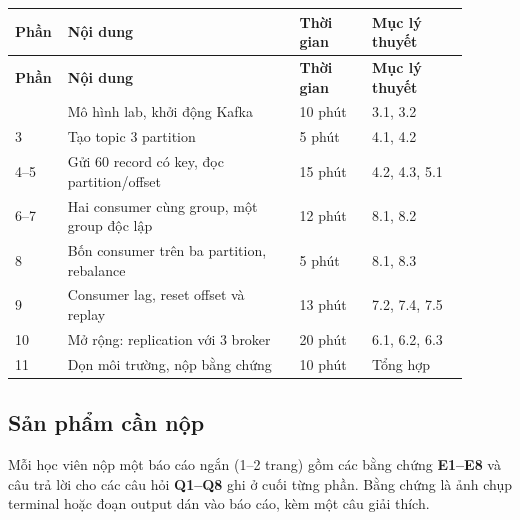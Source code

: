 \begingroup\small
\renewcommand{\arraystretch}{1.2}
\begin{longtable}{@{}p{0.07\linewidth}p{0.48\linewidth}p{0.15\linewidth}p{0.2\linewidth}@{}}
\toprule
\rowcolor{rowLavender}
\textbf{Phần} & \textbf{Nội dung} & \textbf{Thời gian} & \textbf{Mục lý thuyết} \\
\midrule
\endfirsthead
\toprule
\rowcolor{rowLavender}
\textbf{Phần} & \textbf{Nội dung} & \textbf{Thời gian} & \textbf{Mục lý thuyết} \\
\midrule
\endhead
\bottomrule
\endfoot
2 & Mô hình lab, khởi động Kafka & 10 phút & 3.1, 3.2 \\
3 & Tạo topic 3 partition & 5 phút & 4.1, 4.2 \\
4--5 & Gửi 60 record có key, đọc partition/offset & 15 phút & 4.2, 4.3, 5.1 \\
6--7 & Hai consumer cùng group, một group độc lập & 12 phút & 8.1, 8.2 \\
8 & Bốn consumer trên ba partition, rebalance & 5 phút & 8.1, 8.3 \\
9 & Consumer lag, reset offset và replay & 13 phút & 7.2, 7.4, 7.5 \\
10 & Mở rộng: replication với 3 broker & 20 phút & 6.1, 6.2, 6.3 \\
11 & Dọn môi trường, nộp bằng chứng & 10 phút & Tổng hợp \\
\end{longtable}
\endgroup

\subsection{Sản phẩm cần nộp}

Mỗi học viên nộp một báo cáo ngắn (1--2 trang) gồm các bằng chứng \textbf{E1--E8} và câu trả lời cho các câu hỏi \textbf{Q1--Q8} ghi ở cuối từng phần. Bằng chứng là ảnh chụp terminal hoặc đoạn output dán vào báo cáo, kèm một câu giải thích.


